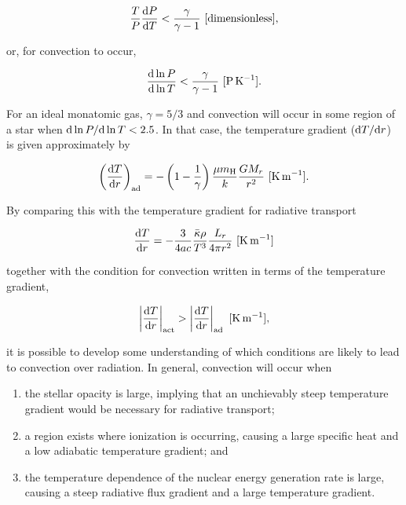 \documentclass[a4paper,10pt]{article}
\begin{document}
\begin{align*}
    \frac{T}{P}\frac{{\rm d}P}{{\rm d}T} < \frac{\gamma}{\gamma-1} ~ [{\rm dimensionless}],
\end{align*}

{\noindent}or, for convection to occur,

\begin{align*}
    \frac{{\rm d}\ln P}{{\rm d}\ln T} < \frac{\gamma}{\gamma-1} ~ [{\rm P\,K^{-1}}].
\end{align*}

{\noindent}For an ideal monatomic gas, $\gamma=5/3$ and convection will occur in some region of a star when ${\rm d}\ln P/{\rm d}\ln T<2.5$. In that case, the temperature gradient (${\rm d}T/{\rm d}r$) is given approximately by 

\begin{align*}
    \left(\frac{{\rm d}T}{{\rm d}r}\right)_{\rm ad} = -\left(1-\frac{1}{\gamma}\right) \frac{\mu m_{\rm H}}{k} \frac{GM_r}{r^2} ~ [{\rm K\,m^{-1}}].
\end{align*}

{\noindent}By comparing this with the temperature gradient for radiative transport

\begin{align*}
    \frac{{\rm d}T}{{\rm d}r} = - \frac{3}{4ac} \frac{\bar{\kappa}\rho}{T^3} \frac{L_r}{4\pi r^2} ~ [{\rm K\,m^{-1}}]
\end{align*}

{\noindent}together with the condition for convection written in terms of the temperature gradient, 

\begin{align*}
    \left\lvert\frac{{\rm d}T}{{\rm d}r}\right\rvert_{\rm act} > \left\lvert\frac{{\rm d}T}{{\rm d}r}\right\rvert_{\rm ad} ~ [{\rm K\,m^{-1}}],
\end{align*}

{\noindent}it is possible to develop some understanding of which conditions are likely to lead to convection over radiation. In general, convection will occur when

\begin{enumerate}
    \item the stellar opacity is large, implying that an unchievably steep temperature gradient would be necessary for radiative transport;
    \item a region exists where ionization is occurring, causing a large specific heat and a low adiabatic temperature gradient; and
    \item the temperature dependence of the nuclear energy generation rate is large, causing a steep radiative flux gradient and a large temperature gradient.
\end{enumerate}
\end{document}
